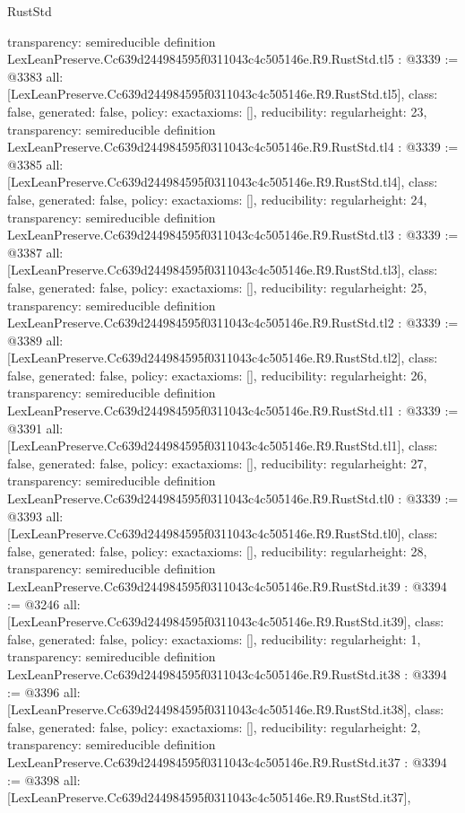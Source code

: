 \begin{lexlean}{RustStd}
\begin{coremodule}
{  transparency: semireducible
}
definition LexLeanPreserve.Cc639d244984595f0311043c4c505146e.R9.RustStd.tl5 : @3339 := @3383 {
  all: [LexLeanPreserve.Cc639d244984595f0311043c4c505146e.R9.RustStd.tl5],
  class: false,
  generated: false,
  policy: exact{axioms: []},
  reducibility: regular{height: 23},
  transparency: semireducible
}
definition LexLeanPreserve.Cc639d244984595f0311043c4c505146e.R9.RustStd.tl4 : @3339 := @3385 {
  all: [LexLeanPreserve.Cc639d244984595f0311043c4c505146e.R9.RustStd.tl4],
  class: false,
  generated: false,
  policy: exact{axioms: []},
  reducibility: regular{height: 24},
  transparency: semireducible
}
definition LexLeanPreserve.Cc639d244984595f0311043c4c505146e.R9.RustStd.tl3 : @3339 := @3387 {
  all: [LexLeanPreserve.Cc639d244984595f0311043c4c505146e.R9.RustStd.tl3],
  class: false,
  generated: false,
  policy: exact{axioms: []},
  reducibility: regular{height: 25},
  transparency: semireducible
}
definition LexLeanPreserve.Cc639d244984595f0311043c4c505146e.R9.RustStd.tl2 : @3339 := @3389 {
  all: [LexLeanPreserve.Cc639d244984595f0311043c4c505146e.R9.RustStd.tl2],
  class: false,
  generated: false,
  policy: exact{axioms: []},
  reducibility: regular{height: 26},
  transparency: semireducible
}
definition LexLeanPreserve.Cc639d244984595f0311043c4c505146e.R9.RustStd.tl1 : @3339 := @3391 {
  all: [LexLeanPreserve.Cc639d244984595f0311043c4c505146e.R9.RustStd.tl1],
  class: false,
  generated: false,
  policy: exact{axioms: []},
  reducibility: regular{height: 27},
  transparency: semireducible
}
definition LexLeanPreserve.Cc639d244984595f0311043c4c505146e.R9.RustStd.tl0 : @3339 := @3393 {
  all: [LexLeanPreserve.Cc639d244984595f0311043c4c505146e.R9.RustStd.tl0],
  class: false,
  generated: false,
  policy: exact{axioms: []},
  reducibility: regular{height: 28},
  transparency: semireducible
}
definition LexLeanPreserve.Cc639d244984595f0311043c4c505146e.R9.RustStd.it39 : @3394 := @3246 {
  all: [LexLeanPreserve.Cc639d244984595f0311043c4c505146e.R9.RustStd.it39],
  class: false,
  generated: false,
  policy: exact{axioms: []},
  reducibility: regular{height: 1},
  transparency: semireducible
}
definition LexLeanPreserve.Cc639d244984595f0311043c4c505146e.R9.RustStd.it38 : @3394 := @3396 {
  all: [LexLeanPreserve.Cc639d244984595f0311043c4c505146e.R9.RustStd.it38],
  class: false,
  generated: false,
  policy: exact{axioms: []},
  reducibility: regular{height: 2},
  transparency: semireducible
}
definition LexLeanPreserve.Cc639d244984595f0311043c4c505146e.R9.RustStd.it37 : @3394 := @3398 {
  all: [LexLeanPreserve.Cc639d244984595f0311043c4c505146e.R9.RustStd.it37],
}
\end{coremodule}
\end{lexlean}
